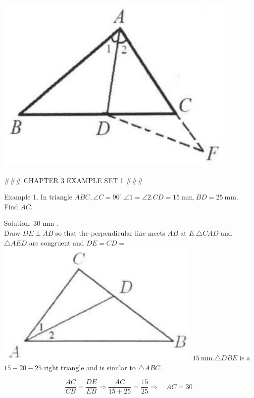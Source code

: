 \documentclass[10pt]{article}
\begin{document}
\includegraphics[max width=\textwidth, center]{2025_04_17_97bc1f7e44d93c271a88g-054(2)}


### CHAPTER 3 EXAMPLE SET 1 ###

Example 1. In triangle \(A B C, \angle C=90^{\circ} . \angle 1=\angle 2 . C D=15 \mathrm{~mm}, B D=25 \mathrm{~mm}\). Find \(A C\).

Solution: 30 mm .\\
Draw \(D E \perp A B\) so that the perpendicular line meets \(A B\) at \(E . \triangle C A D\) and \(\triangle A E D\) are congruent and \(D E=C D=\)\\
\includegraphics[max width=\textwidth]{2025_04_17_97bc1f7e44d93c271a88g-055} \(15 \mathrm{~mm} . \triangle D B E\) is a \(15-20-25\) right triangle and is similar to \(\triangle A B C\).

\[
\frac{A C}{C B}=\frac{D E}{E B} \Rightarrow \frac{A C}{15+25}=\frac{15}{25} \Rightarrow \quad A C=30
\]
\end{document}
